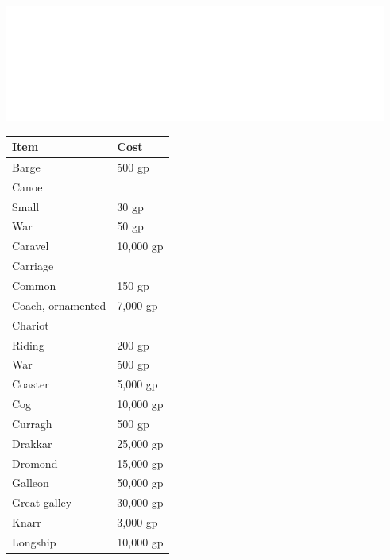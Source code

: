 \begin{multicols}{2}
\noindent\includegraphics[width=\columnwidth, height=1.5in]{testblock.pdf} 

\noindent
\begin{minipage}{\columnwidth}

\label{transport}
\noindent
\begin{tabular}{|p{}|p{}|}
\hline
Item				& Cost \\
\hline\hline
\rowcolor[gray]{.9}Barge				& 500 gp \\
Canoe				&  \\
\hspace{1em}Small				& 30 gp \\
\rowcolor[gray]{.9}\hspace{1em}War				& 50 gp \\
Caravel				& 10,000 gp \\
\rowcolor[gray]{.9}Carriage			&  \\
\rowcolor[gray]{.9}\hspace{1em}Common			& 150 gp \\
\hspace{1em}Coach, ornamented	& 7,000 gp \\
\rowcolor[gray]{.9}Chariot				&  \\
\rowcolor[gray]{.9}\hspace{1em}Riding			& 200 gp \\
\hspace{1em}War				& 500 gp \\
\rowcolor[gray]{.9}Coaster				& 5,000 gp \\
Cog					& 10,000 gp \\
\rowcolor[gray]{.9}Curragh				& 500 gp \\
Drakkar				& 25,000 gp \\
\rowcolor[gray]{.9}Dromond				& 15,000 gp \\
Galleon				& 50,000 gp \\
\rowcolor[gray]{.9}Great galley		& 30,000 gp \\
Knarr				& 3,000 gp \\
\rowcolor[gray]{.9}Longship			& 10,000 gp \\

\end{tabular}
\end{minipage}
\end{multicols}
